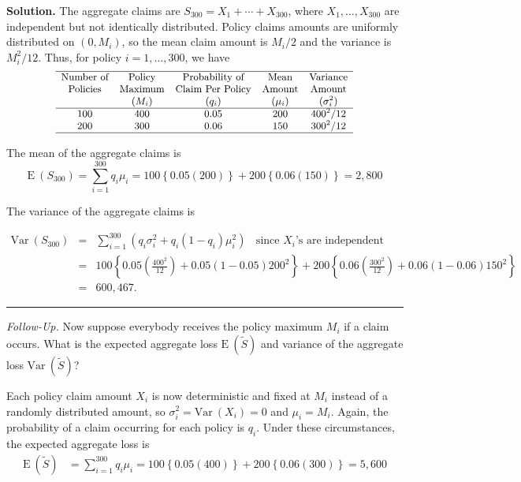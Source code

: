 \documentclass[]{book}
\theoremstyle{definition}
\theoremstyle{definition}
\theoremstyle{definition}
\theoremstyle{remark}
\begin{document}
\hypertarget{toggleExampleAggLoss.2.1}{}
\textbf{Solution.} The aggregate claims are
\(S_{300} = X_1+\cdots+X_{300}\), where \(X_1, \ldots, X_{300}\) are
independent but not identically distributed. Policy claims amounts are
uniformly distributed on \((0,M_i)\), so the mean claim amount is
\(M_i/2\) and the variance is\(M_i^2/12\). Thus, for policy
\(i=1,\ldots,300\), we have \[
{\small 
\begin{matrix}
    \begin{array}{ccccc} \hline
        \text{Number of} & \text{Policy} & \text{Probability of} & \text{Mean} & \text{Variance}\\
        \text{Policies} &  \text{Maximum} &  \text{Claim Per Policy} & \text{Amount} & \text{Amount}\\
        & (M_i) & (q_{i}) & (\mu_{i}) & (\sigma_{i}^2) \\ \hline
        100 & 400 & 0.05 & 200 & 400^2/12\\
        200 & 300 & 0.06 & 150 & 300^2/12 \\ \hline
    \end{array}
\end{matrix}
}
\]

The mean of the aggregate claims is
\[\mathrm{E~} (S_{300}) = \sum_{i=1}^{300} q_i \mu_i = 100\left\{0.05(200)\right\} + 200\left\{0.06 (150) \right\} = 2,800\]

The variance of the aggregate claims is

\begin{eqnarray*}
    \mathrm{Var~}(S_{300}) &=& \sum_{i=1}^{300} \left( q_i \sigma _i^2+q_i (1-q_i)\mu_i^2 \right) ~~~~ \text{since } X_i \text{'s are independent} \\
    &=& 100\left\{ 0.05 \left(\frac{400^2}{12}\right) +0.05 (1-0.05 )200^2 \right\}+
    200\left\{
    0.06 \left(\frac{300^2}{12}\right) +0.06 (1-0.06 )150^2 \right\}\\
    &=& 600,467.
\end{eqnarray*}

\begin{center}\rule{0.5\linewidth}{\linethickness}\end{center}

\emph{Follow-Up.} Now suppose everybody receives the policy maximum
\(M_i\) if a claim occurs. What is the expected aggregate loss
\(\mathrm{E~}(\tilde{S})\) and variance of the aggregate loss
\(\mathrm{Var~}(\tilde{S})\)?

Each policy claim amount \(X_i\) is now deterministic and fixed at
\(M_i\) instead of a randomly distributed amount, so
\(\sigma_i^2 = \mathrm{Var~} (X_i) = 0\) and \(\mu_i = M_i\). Again, the
probability of a claim occurring for each policy is \(q_i\). Under these
circumstances, the expected aggregate loss is \[\begin{aligned}
\mathrm{E~}(\tilde{S}) &= \sum_{i=1}^{300} q_i \mu_i = 100 \left\{0.05(400) \right\} + 200 \left\{ 0.06(300) \right\} = 5,600
\end{aligned}\]
\end{document}
